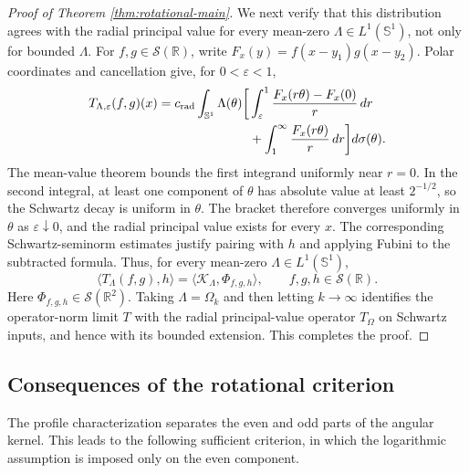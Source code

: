 \documentclass[11pt]{amsart}
\theoremstyle{remark}
\numberwithin{equation}{section}
\newcommand{\R}{\mathbb R}
\newcommand{\Sph}{\mathbb S^1}
\begin{document}
\begin{proof}[Proof of Theorem \ref{thm:rotational-main}]
		We next verify that this distribution agrees with the radial principal value
		for every mean-zero \(\Lambda\in L^1(\Sph)\), not only for bounded
		\(\Lambda\).  For \(f,g\in\mathcal S(\R)\), write
		\(F_x(y)=f(x-y_1)g(x-y_2)\).  Polar coordinates and cancellation give, for
		\(0<\varepsilon<1\),
		\[
		\begin{aligned}
			T_{\Lambda,\varepsilon}(f,g)(x)
			=c_{\rm rad}\int_{\Sph}\Lambda(\theta)
			\bigg[
			&\int_\varepsilon^1
			\frac{F_x(r\theta)-F_x(0)}r\,dr\\
			&+\int_1^\infty\frac{F_x(r\theta)}r\,dr
			\bigg]d\sigma(\theta).
		\end{aligned}
		\]
		The mean-value theorem bounds the first integrand uniformly near \(r=0\).  In
		the second integral, at least one component of \(\theta\) has absolute value
		at least \(2^{-1/2}\), so the Schwartz decay is uniform in \(\theta\).  The
		bracket therefore converges uniformly in \(\theta\) as
		\(\varepsilon\downarrow0\), and the radial principal value exists for every
		\(x\).  The corresponding Schwartz-seminorm estimates justify pairing with
		\(h\) and applying Fubini to the subtracted formula.  Thus, for every
		mean-zero \(\Lambda\in L^1(\Sph)\),
		\begin{equation}\label{eq:finite-part-pv-pairing}
			\langle T_{\Lambda}(f,g),h\rangle
			=
			\langle\mathcal K_{\Lambda},\Phi_{f,g,h}\rangle,
			\qquad f,g,h\in\mathcal S(\R).
		\end{equation}
		Here \(\Phi_{f,g,h}\in\mathcal S(\R^2)\).  Taking \(\Lambda=\Omega_k\) and
		then letting \(k\to\infty\) identifies the operator-norm limit \(T\) with the
		radial principal-value operator \(T_\Omega\) on Schwartz inputs, and hence
		with its bounded extension.  This completes the proof.
	\end{proof}
	
	\subsection{Consequences of the rotational criterion}
	
	The profile characterization separates the even and odd parts of the angular
	kernel.  This leads to the following sufficient criterion, in which the
	logarithmic assumption is imposed only on the even component.
	
\end{document}
